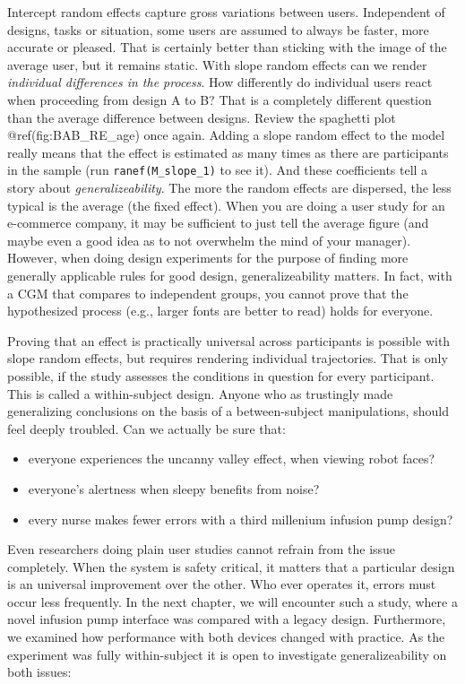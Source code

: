\documentclass[]{svmono}
\providecommand{\tightlist}{%
  \setlength{\itemsep}{0pt}\setlength{\parskip}{0pt}}
\theoremstyle{definition}
\theoremstyle{definition}
\theoremstyle{definition}
\theoremstyle{remark}
\begin{document}
Intercept random effects capture gross variations between users.
Independent of designs, tasks or situation, some users are assumed to
always be faster, more accurate or pleased. That is certainly better
than sticking with the image of the average user, but it remains static.
With slope random effects can we render \emph{individual differences in
the process}. How differently do individual users react when proceeding
from design A to B? That is a completely different question than the
average difference between designs. Review the spaghetti plot
@ref(fig:BAB\_RE\_age) once again. Adding a slope random effect to the
model really means that the effect is estimated as many times as there
are participants in the sample (run \texttt{ranef(M\_slope\_1)} to see
it). And these coefficients tell a story about \emph{generalizeability}.
The more the random effects are dispersed, the less typical is the
average (the fixed effect). When you are doing a user study for an
e-commerce company, it may be sufficient to just tell the average figure
(and maybe even a good idea as to not overwhelm the mind of your
manager). However, when doing design experiments for the purpose of
finding more generally applicable rules for good design,
generalizeability matters. In fact, with a CGM that compares to
independent groups, you cannot prove that the hypothesized process
(e.g., larger fonts are better to read) holds for everyone.

Proving that an effect is practically universal across participants is
possible with slope random effects, but requires rendering individual
trajectories. That is only possible, if the study assesses the
conditions in question for every participant. This is called a
within-subject design. Anyone who as trustingly made generalizing
conclusions on the basis of a between-subject manipulations, should feel
deeply troubled. Can we actually be sure that:

\begin{itemize}
\tightlist
\item
  everyone experiences the uncanny valley effect, when viewing robot
  faces?
\item
  everyone's alertness when sleepy benefits from noise?
\item
  every nurse makes fewer errors with a third millenium infusion pump
  design?
\end{itemize}

Even researchers doing plain user studies cannot refrain from the issue
completely. When the system is safety critical, it matters that a
particular design is an universal improvement over the other. Who ever
operates it, errors must occur less frequently. In the next chapter, we
will encounter such a study, where a novel infusion pump interface was
compared with a legacy design. Furthermore, we examined how performance
with both devices changed with practice. As the experiment was fully
within-subject it is open to investigate generalizeability on both
issues:
\end{document}
